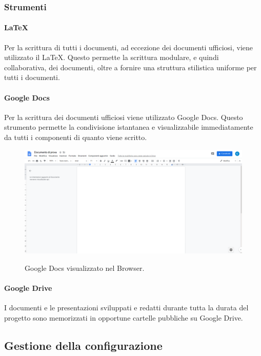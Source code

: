 \documentclass[../norme-di-progetto.tex]{subfiles}
\begin{document}
\subsubsection{Strumenti}
\paragraph{\LaTeX}
Per la scrittura di tutti i documenti, ad eccezione dei documenti ufficiosi, viene utilizzato il  \LaTeX. Questo permette la scrittura modulare, e quindi collaborativa, dei documenti, oltre a fornire una struttura stilistica uniforme per tutti i documenti.
\paragraph{Google Docs}
Per la scrittura dei documenti ufficiosi viene utilizzato Google Docs. Questo strumento permette la condivisione istantanea e visualizzabile immediatamente da tutti i componenti di quanto viene scritto.

\begin{figure}[H]
  \centering
  \includegraphics[width=15cm]{img/docs.png}
  \label{fig:github}
  \caption{Google Docs visualizzato nel Browser.}
\end{figure}

\paragraph{Google Drive}
I documenti e le presentazioni sviluppati e redatti durante tutta la durata del progetto sono memorizzati in opportune cartelle pubbliche su Google Drive.


\subsection{Gestione della configurazione}
\end{document}
